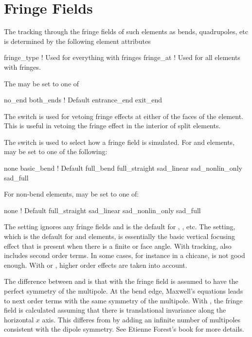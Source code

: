 \section{Fringe Fields}
\label{s:fringe}

The tracking through the fringe fields of such elements as bends,
quadrupoles, etc is determined by the following element attributes
\begin{example}
  fringe_type    ! Used for everything with fringes
  fringe_at      ! Used for all elements with fringes.
\end{example}

The  may be set to one of
\begin{example}
  no_end         
  both_ends             ! Default
  entrance_end
  exit_end
\end{example}

The  switch is used for vetoing fringe effects at
either of the faces of the element. This is useful in vetoing the
fringe effect in the interior of split elements.

The  switch is used to select how a fringe field is simulated.
For  and  elements,  may be set to one of the following:
\begin{example}
  none              
  basic_bend        ! Default 
  full_bend
  full_straight
  sad_linear
  sad_nonlin_only
  sad_full
\end{example}
For non-bend elements,  may be set to one of:
\begin{example}
  none              ! Default 
  full_straight
  sad_linear
  sad_nonlin_only
  sad_full
\end{example}

The  setting ignores any fringe fields and is the default for
, , etc. The  setting,
which is the default for  and  elements, is
essentially the basic vertical focusing effect that is present when
there is a finite  or  face angle. With
 tracking,  also includes second
order terms.  In some cases, for instance in a chicane,
 is not good enough. With  or
, higher order effects are taken into account.  

The difference between  and  is that
with  the fringe field is assumed to have the
perfect symmetry of the multipole. At the bend edge, Maxwell's
equations leads to next order terms with the same symmetry of the
multipole. With , the fringe field is calculated
assuming that there is translational invariance along the horizontal
$x$ axis. This differes from  by adding an infinite
number of multipoles consistent with the dipole symmetry. See Etienne
Forest's book\cite{b:forest} for more details.

